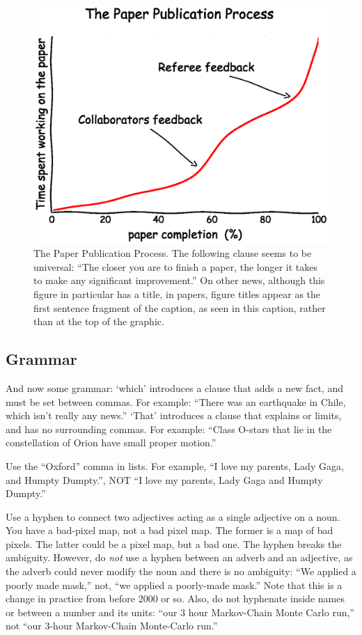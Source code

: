 \begin{figure}[tb]
\centering
\includegraphics[width=\linewidth, clip]{figs/paperwriting.ps}
\caption{The Paper Publication Process.  The following clause seems to be
  universal: ``The closer you are to finish a paper, the longer it
  takes to make any significant improvement.''  On other news,
  although this figure in particular has a title, in papers, figure titles
  appear as the first sentence fragment of the
  caption, as seen in this caption, rather than at the top of the
  graphic.}
\label{fig:writing}
\end{figure}


\subsection{Grammar}
\label{sec:grammar}

And now some grammar: `which' introduces a clause that adds a new fact,
and must be set between commas.  For example: ``There was an earthquake
in Chile, which isn't really any news.''  `That' introduces a clause
that explains or limits, and has no surrounding commas.  For example:
``Class O-stars that lie in the constellation of Orion have small proper
motion.''

Use the ``Oxford'' comma in lists.  For example, ``I love my parents, Lady Gaga, and Humpty Dumpty.'', NOT ``I love my parents, Lady Gaga and Humpty Dumpty.''

Use a hyphen to connect two adjectives acting as a single adjective on
a noun.  You have a bad-pixel map, not a bad pixel map.  The former is
a map of bad pixels.  The latter could be a pixel map, but a bad one.
The hyphen breaks the ambiguity.  However, do {\em not}\/ use a hyphen
between an adverb and an adjective, as the adverb could never modify
the noun and there is no ambiguity: ``We applied a poorly made mask,''
not, ``we applied a poorly-made mask.''  Note that this is a change in
practice from before 2000 or so.  Also, do not hyphenate inside names
or between a number and its units: ``our 3 hour Markov-Chain Monte
Carlo run,'' not ``our 3-hour Markov-Chain Monte-Carlo run.''


